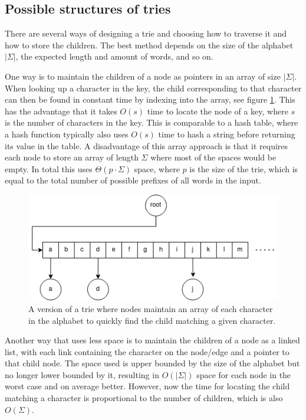 \subsection{Possible structures of tries} \label{sec:posStrucOfTrie}

There are several ways of designing a trie and choosing how to traverse it and how to store the children. The best method depends on the size of the alphabet $|\Sigma|$, the expected length and amount of words, and so on. 

One way is to maintain the children of a node as pointers in an array of size $|\Sigma|$. When looking up a character in the key, the child corresponding to that character can then be found in constant time by indexing into the array, see figure \ref{fig:trie_array}. This has the advantage that it takes $O(s)$ time to locate the node of a key, where $s$ is the number of characters in the key. This is comparable to a hash table, where a hash function typically also uses $O(s)$ time to hash a string before returning its value in the table. A disadvantage of this array approach is that it requires each node to store an array of length $\Sigma$ where most of the spaces would be empty. In total this uses $\Theta(p\cdot\Sigma)$ space, where $p$ is the size of the trie, which is equal to the total number of possible prefixes of all words in the input. 

\begin{figure}[ht!]
    \centering
    \includegraphics[width=.9\textwidth]{LaTeX/Figures/Tries/Trie_array.png}
    \caption{A version of a trie where nodes maintain an array of each character in the alphabet to quickly find the child matching a given character. }
    \label{fig:trie_array}
\end{figure}

Another way that uses less space is to maintain the children of a node as a linked list, with each link containing the character on the node/edge and a pointer to that child node. The space used is upper bounded by the size of the alphabet but no longer lower bounded by it, resulting in $O(|\Sigma|)$ space for each node in the worst case and on average better. However, now the time for locating the child matching a character is proportional to the number of children, which is also $O(\Sigma)$. 

